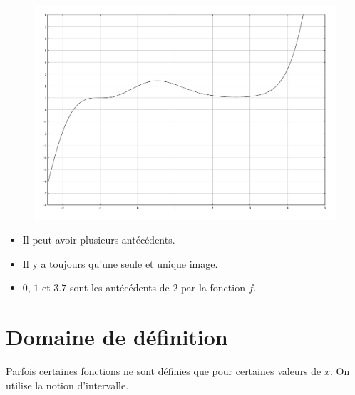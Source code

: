 \documentclass[paper=a4, fontsize=9pt]{scrartcl} %
\begin{document}
\begin{multicols}{2}

  \begin{figure}[H]
    \centering
    \includegraphics[width=0.7\linewidth]{sources/cours/courbe.pdf}
  \end{figure}


  \begin{itemize}
  \item Il peut avoir plusieurs antécédents.
  \item Il y a toujours qu'une seule et unique image.
  \item $0$, $1$ et $3.7$ sont les antécédents de $2$ par la fonction $f$.
  \end{itemize}
\end{multicols}

\newpage
\section{Domaine de définition}

Parfois certaines fonctions ne sont définies que pour certaines valeurs de $x$. On utilise la notion d'intervalle.
\end{document}
